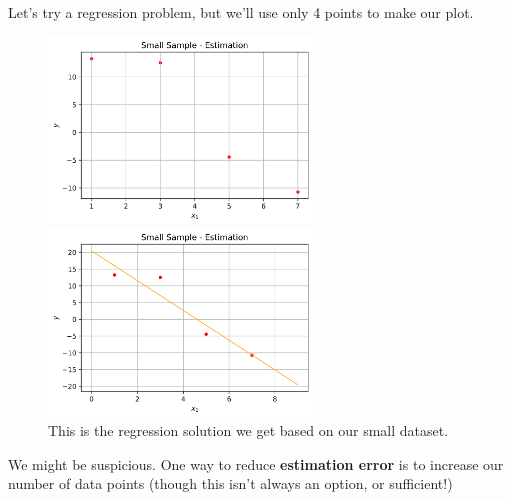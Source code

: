         \miniex Let's try a regression problem, but we'll use only 4 points to make our plot.
        
        \begin{figure}[H]

            \includegraphics[width=70mm,scale=0.5]{images/regression_images/Estimation_Limited_Sample.png}

            \includegraphics[width=70mm,scale=0.5]{images/regression_images/Estimation_Limited_Sample_Regression.png}
        
            \caption*{This is the regression solution we get based on our small dataset.}
        \end{figure}
        
        We might be suspicious. One way to reduce \textbf{estimation error} is to increase our number of data points (though this isn't always an option, or sufficient!)
        
